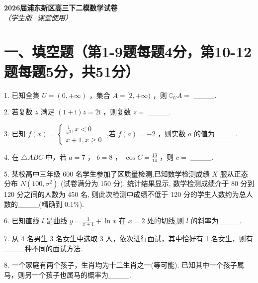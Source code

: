 \documentclass[10pt]{article}
\newcommand{\boardspace}[1]{%
  \par\vspace{#1}
}
\begin{document}
\begin{center}
\Large\textbf{2026届浦东新区高三下二模数学试卷}\\[0.5em]
\normalsize\textit{（学生版·课堂使用）}
\end{center}

\section*{一、填空题（第1-9题每题4分，第10-12题每题5分，共51分）}

1. 已知全集 \(U = \left( {0, + \infty }\right)\) ，集合 \(A = \lbrack 2, + \infty )\) ，则 \({\complement }_{U}A =\) \_\_\_\_.

\boardspace{1.5cm}

2. 若复数 \(z\) 满足 \(\left( {1 + \mathrm{i}}\right) z = {2\mathrm{i}}\) ，则复数 \(z =\) \_\_\_\_.

\boardspace{1.5cm}

3. 已知 \(f\left( x\right)  = \left\{  \begin{array}{l} \frac{1}{{x}^{3}},x < 0 \\  x + 1,x \geq  0 \end{array}\right.\) ,若 \(f\left( a\right)  =  - 2\) ，则实数 \(a\) 的值为\_\_\_\_.

\boardspace{1.5cm}

4. 在 \(\bigtriangleup  {ABC}\) 中，若 \(a = 7\) ， \(b = 8\) ， \(\cos C = \frac{13}{14}\) ，则 \(c =\) \_\_\_\_.

\boardspace{1.5cm}

5. 某校高中三年级 600 名学生参加了区质量检测,已知数学检测成绩 \(X\) 服从正态分布 \(N\left( {{100},{\sigma }^{2}}\right)\) (试卷满分为 150 分). 统计结果显示, 数学检测成绩介于 80 分到 120 分之间的人数为 450 名, 则此次检测中成绩不低于 120 分的学生人数约为总人数的\_\_\_\_(精确到 0.1\%).

\boardspace{1.5cm}

6. 已知直线 \(l\) 是曲线 \(y = \frac{3}{x + 1} + \ln x\) 在 \(x = 2\) 处的切线,则 \(l\) 的斜率为\_\_\_\_.

\boardspace{1.5cm}

7. 从 4 名男生 3 名女生中选取 3 人，依次进行面试，其中恰好有 1 名女生，则有\_\_\_\_种不同的面试方法.

\boardspace{1.5cm}

8. 一个家庭有两个孩子，生肖均为十二生肖之一(等可能). 已知其中一个孩子属马，则另一个孩子也属马的概率为\_\_\_\_.

\boardspace{1.5cm}
\end{document}
